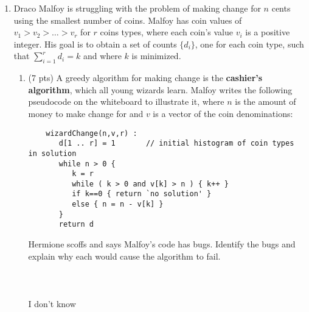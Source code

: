 \documentclass[12pt]{article}
\begin{document}
\begin{enumerate}
\begin{enumerate}
	
	\item \label{2c} (10 pts) Produce a plot showing (i) the length of the longest chain (were we to use chaining for resolving collisions under $h(x)$) as a function of the number $n$ of these strings that we hash into a table with $\ell=175$ buckets, (ii) the exact upper bound on the depth of a balanced binary tree with $n$ items stored, and (iii) the length of the longest chain were we to use a uniform hash instead of $h(x)$. Include a guide of $c\,n$, that is, graph $c n$ on the same chart, for some value of $c$ you find useful, so that you can compare this graph to that of your data.
	
	Then, comment on (i) how much shorter the longest chain would be under a uniform hash than under $h(x)$, and (ii)  the value of $n$ at which the balanced binary tree becomes a more efficient data structure than $h(x)$ and separately a uniform hash.
	\\ \\ \\ \\I don't know
	\pagebreak

	\end{enumerate}
	


	\item Draco Malfoy is struggling with the problem of making change for $n$ cents using the smallest number of coins. Malfoy has coin values of $v_{1} > v_{2} > \dots > v_{r}$ for $r$ coins types, where each coin's value $v_{i}$ is a positive integer. His goal is to obtain a set of counts $\{d_{i}\}$, one for each coin type, such that $\sum_{i=1}^{r}d_{i}=k$ and where $k$ is minimized.
	\begin{enumerate}
	\item \label{3a} (7 pts) A greedy algorithm for making change is the \textbf{cashier's algorithm}, which all young wizards learn. Malfoy writes the following pseudocode on the whiteboard to illustrate it, where $n$ is the amount of money to make change for and $v$ is a vector of the coin denominations:
	\begin{small}
	\begin{verbatim}
	wizardChange(n,v,r) :
	   d[1 .. r] = 1       // initial histogram of coin types in solution
	   while n > 0 {
	      k = r
	      while ( k > 0 and v[k] > n ) { k++ }
	      if k==0 { return `no solution' }
	      else { n = n - v[k] }
	   }
	   return d
	\end{verbatim}
	\end{small}
	Hermione scoffs and says Malfoy's code has bugs. Identify the bugs and explain why each would cause the algorithm to fail.
	\\ \\ \\ \\I don't know
	\pagebreak
	


\end{enumerate}
\end{enumerate}
\end{document}
